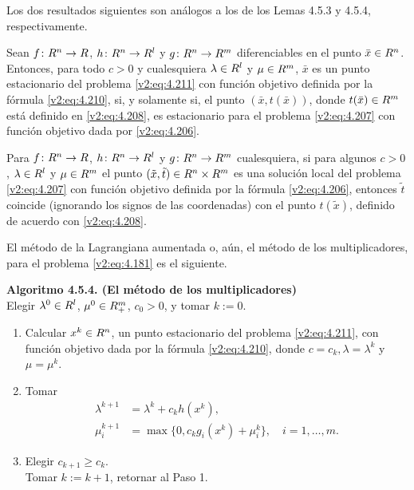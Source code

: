 Los dos resultados siguientes son análogos a los de los Lemas 4.5.3 y 4.5.4, respectivamente.

\begin{lemma}\label{v2:lem:4.5.6}
    Sean $f \colon R^n \to R$, $h \colon R^n \to R^l$ y $g \colon R^n \to R^m$ diferenciables en el punto $\bar{x} \in R^n$.
    Entonces, para todo $c > 0$ y cualesquiera $\lambda \in R^l$ y $\mu \in R^m$, $\bar{x}$ es un punto estacionario del problema \eqref{v2:eq:4.211} con función objetivo definida por la fórmula \eqref{v2:eq:4.210}, si, y solamente si, el punto $(\bar{x}, t(\bar{x}))$, donde $t(\bar{x}) \in R^m$ está definido en \eqref{v2:eq:4.208}, es estacionario para el problema \eqref{v2:eq:4.207} con función objetivo dada por \eqref{v2:eq:4.206}.
\end{lemma}


\begin{lemma}\label{v2:lem:4.5.7}
    Para $f \colon R^n \to R$, $h \colon R^n \to R^l$ y $g \colon R^n \to R^m$ cualesquiera, si para algunos $c > 0$, $\lambda \in R^l$ y $\mu \in R^m$ el punto $(\tilde{x}, \tilde{t}) \in R^n \times R^m$ es una solución local del problema \eqref{v2:eq:4.207} con función objetivo definida por la fórmula \eqref{v2:eq:4.206}, entonces $\tilde{t}$ coincide (ignorando los signos de las coordenadas) con el punto $t(\tilde{x})$, definido de acuerdo con \eqref{v2:eq:4.208}.
\end{lemma}


El método de la Lagrangiana aumentada o, aún, el método de los multiplicadores, para el problema \eqref{v2:eq:4.181} es el siguiente.

\noindent \textbf{Algoritmo 4.5.4. (El método de los multiplicadores)} \\
Elegir $\lambda^0 \in R^l$, $\mu^0 \in R^m_+$, $c_0 > 0$, y tomar $k := 0$.
\begin{enumerate}
    \item Calcular $x^k \in R^n$, un punto estacionario del problema \eqref{v2:eq:4.211}, con función objetivo dada por la fórmula \eqref{v2:eq:4.210}, donde $c = c_k, \lambda = \lambda^k$ y $\mu = \mu^k$.
    \item Tomar
    \begin{align}
        \lambda^{k+1} &= \lambda^k + c_k h(x^k), \nonumber \\
        \mu^{k+1}_i &= \max\{0, c_k g_i(x^k) + \mu_i^k\}, \quad i = 1, \dots, m.
        \label{v2:eq:4.214}
    \end{align}
    \item Elegir $c_{k+1} \ge c_k$. \\
    Tomar $k := k + 1$, retornar al Paso 1.
\end{enumerate}

